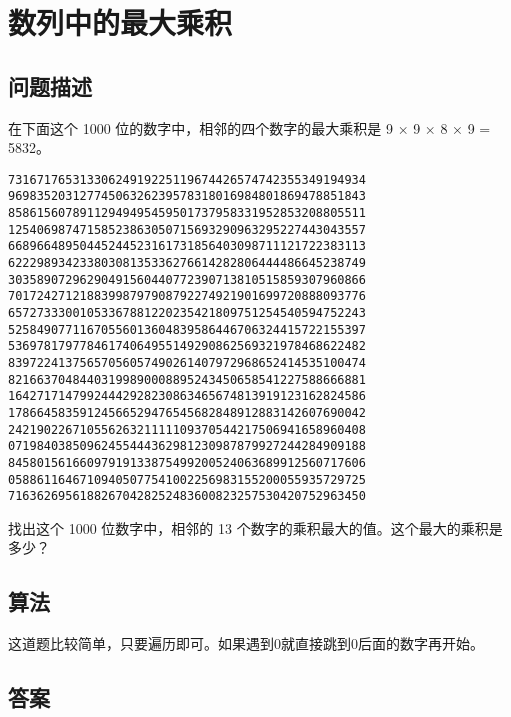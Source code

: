 \section{数列中的最大乘积}
\subsection{问题描述}
\begin{tcolorbox}
在下面这个 1000 位的数字中，相邻的四个数字的最大乘积是 9 × 9 × 8 × 9 = 5832。

\begin{verbatim}
73167176531330624919225119674426574742355349194934
96983520312774506326239578318016984801869478851843
85861560789112949495459501737958331952853208805511
12540698747158523863050715693290963295227443043557
66896648950445244523161731856403098711121722383113
62229893423380308135336276614282806444486645238749
30358907296290491560440772390713810515859307960866
70172427121883998797908792274921901699720888093776
65727333001053367881220235421809751254540594752243
52584907711670556013604839586446706324415722155397
53697817977846174064955149290862569321978468622482
83972241375657056057490261407972968652414535100474
82166370484403199890008895243450658541227588666881
16427171479924442928230863465674813919123162824586
17866458359124566529476545682848912883142607690042
24219022671055626321111109370544217506941658960408
07198403850962455444362981230987879927244284909188
84580156166097919133875499200524063689912560717606
05886116467109405077541002256983155200055935729725
71636269561882670428252483600823257530420752963450
\end{verbatim}

找出这个 1000 位数字中，相邻的 13 个数字的乘积最大的值。这个最大的乘积是多少？
\end{tcolorbox}

\subsection{算法}
这道题比较简单，只要遍历即可。如果遇到0就直接跳到0后面的数字再开始。

\subsection{答案}

